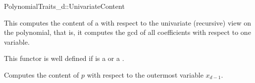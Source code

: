 \begin{ccRefConcept}{PolynomialTraits_d::UnivariateContent}

\ccDefinition

This  computes the content of a 
with respect to the univariate (recursive) view on the 
polynomial, that is, it computes the gcd of all 
coefficients  with respect to one variable. 

This functor is well defined if  is 
a  or a .

\ccRefines 
{}

\ccTypes

\ccGlue
{}\ccGlue

\ccOperations
{}
         {Computes the content of $p$ with respect to the outermost variable $x_{d-1}$. }



\ccSeeAlso

\\

\end{ccRefConcept}
